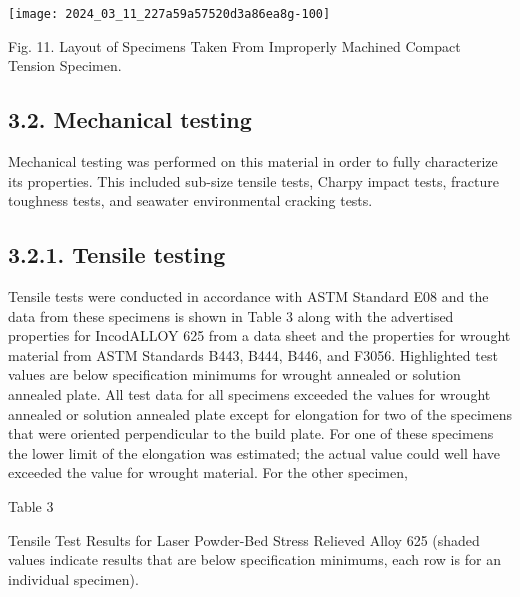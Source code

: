 \documentclass[10pt]{article}
\begin{document}
\begin{center}
\texttt{[image: 2024\_03\_11\_227a59a57520d3a86ea8g-100]}
\end{center}

Fig. 11. Layout of Specimens Taken From Improperly Machined Compact Tension Specimen.

\subsection*{3.2. Mechanical testing}
Mechanical testing was performed on this material in order to fully characterize its properties. This included sub-size tensile tests, Charpy impact tests, fracture toughness tests, and seawater environmental cracking tests.

\subsection*{3.2.1. Tensile testing}
Tensile tests were conducted in accordance with ASTM Standard E08 and the data from these specimens is shown in Table 3 along with the advertised properties for IncodALLOY 625 from a data sheet and the properties for wrought material from ASTM Standards B443, B444, B446, and F3056. Highlighted test values are below specification minimums for wrought annealed or solution annealed plate. All test data for all specimens exceeded the values for wrought annealed or solution annealed plate except for elongation for two of the specimens that were oriented perpendicular to the build plate. For one of these specimens the lower limit of the elongation was estimated; the actual value could well have exceeded the value for wrought material. For the other specimen,

Table 3

Tensile Test Results for Laser Powder-Bed Stress Relieved Alloy 625 (shaded values indicate results that are below specification minimums, each row is for an individual specimen).
\end{document}
